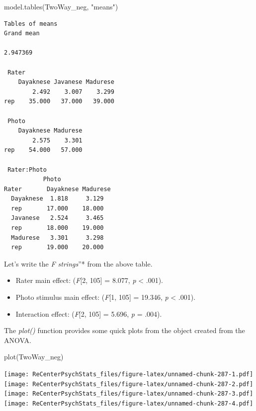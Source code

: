 \documentclass[
  11pt,
]{book}
\newenvironment{Shaded}{\begin{snugshade}}{\end{snugshade}}
\newcommand{\FunctionTok}[1]{\textcolor[rgb]{0.00,0.00,0.00}{#1}}
\newcommand{\NormalTok}[1]{#1}
\newcommand{\StringTok}[1]{\textcolor[rgb]{0.31,0.60,0.02}{#1}}
\providecommand{\tightlist}{%
  \setlength{\itemsep}{0pt}\setlength{\parskip}{0pt}}
\begin{document}
\begin{Shaded}
\begin{Highlighting}[]
\FunctionTok{model.tables}\NormalTok{(TwoWay\_neg, }\StringTok{"means"}\NormalTok{)}
\end{Highlighting}
\end{Shaded}

\begin{verbatim}
Tables of means
Grand mean
         
2.947369 

 Rater 
    Dayaknese Javanese Madurese
        2.492    3.007    3.299
rep    35.000   37.000   39.000

 Photo 
    Dayaknese Madurese
        2.575    3.301
rep    54.000   57.000

 Rater:Photo 
           Photo
Rater       Dayaknese Madurese
  Dayaknese  1.818     3.129  
  rep       17.000    18.000  
  Javanese   2.524     3.465  
  rep       18.000    19.000  
  Madurese   3.301     3.298  
  rep       19.000    20.000  
\end{verbatim}

Let's write the \emph{F strings}''* from the above table.

\begin{itemize}
\tightlist
\item
  Rater main effect: (\emph{F}{[}2, 105{]} = 8.077, \emph{p} \textless{} .001).
\item
  Photo stimulus main effect: (\emph{F}{[}1, 105{]} = 19.346, \emph{p} \textless{} .001).
\item
  Interaction effect: (\emph{F}{[}2, 105{]} = 5.696, \emph{p} = .004).
\end{itemize}

The \emph{plot()} function provides some quick plots from the object created from the ANOVA.

\begin{Shaded}
\begin{Highlighting}[]
\FunctionTok{plot}\NormalTok{(TwoWay\_neg)}
\end{Highlighting}
\end{Shaded}

\texttt{[image: ReCenterPsychStats\_files/figure-latex/unnamed-chunk-287-1.pdf]} \texttt{[image: ReCenterPsychStats\_files/figure-latex/unnamed-chunk-287-2.pdf]} \texttt{[image: ReCenterPsychStats\_files/figure-latex/unnamed-chunk-287-3.pdf]} \texttt{[image: ReCenterPsychStats\_files/figure-latex/unnamed-chunk-287-4.pdf]}
\end{document}
